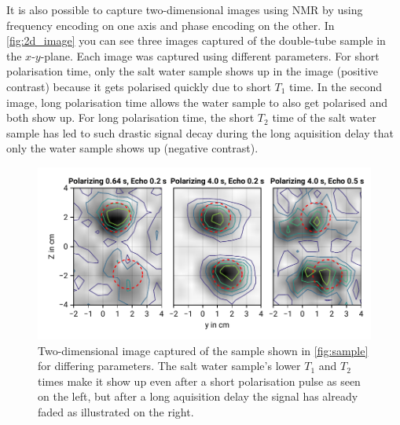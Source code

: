 \documentclass[
    parskip=half, 
    twoside=false,
    twocolumn=true,
    fontsize=11pt,
]{scrarticle}
\begin{document}
It is also possible to capture two-dimensional images using NMR by using frequency encoding on one axis and phase encoding on the other. In \autoref{fig:2d_image} you can see three images captured of the double-tube sample in the $x$-$y$-plane. Each image was captured using different parameters. For short polarisation time, only the salt water sample shows up in the image (positive contrast) because it gets polarised quickly due to short $T_1$ time. In the second image, long polarisation time allows the water sample to also get polarised and both show up. For long polarisation time, the short $T_2$ time of the salt water sample has led to such drastic signal decay during the long aquisition delay that only the water sample shows up (negative contrast).

\begin{figure}
    \centering
    \label{fig:2d_image}
    \includegraphics{figures/08 2d imaging.pdf}
    \caption{Two-dimensional image captured of the sample shown in \autoref{fig:sample} for differing parameters. The salt water sample's lower $T_1$ and $T_2$ times make it show up even after a short polarisation pulse as seen on the left, but after a long aquisition delay the signal has already faded as illustrated on the right.}
\end{figure}
\end{document}
